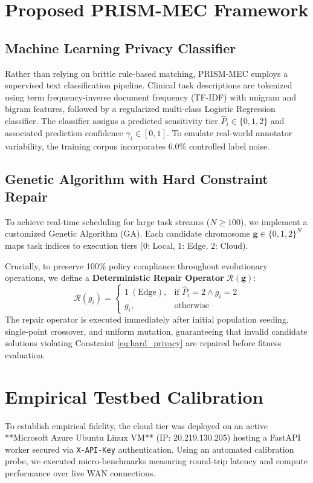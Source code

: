 \documentclass[conference]{IEEEtran}
\begin{document}
\section{Proposed PRISM-MEC Framework}

\subsection{Machine Learning Privacy Classifier}
Rather than relying on brittle rule-based matching, PRISM-MEC employs a supervised text classification pipeline. Clinical task descriptions are tokenized using term frequency-inverse document frequency (TF-IDF) with unigram and bigram features, followed by a regularized multi-class Logistic Regression classifier. The classifier assigns a predicted sensitivity tier $\hat{P}_i \in \{0, 1, 2\}$ and associated prediction confidence $\gamma_i \in [0, 1]$. To emulate real-world annotator variability, the training corpus incorporates 6.0\% controlled label noise.

\subsection{Genetic Algorithm with Hard Constraint Repair}
To achieve real-time scheduling for large task streams ($N \ge 100$), we implement a customized Genetic Algorithm (GA). Each candidate chromosome $\mathbf{g} \in \{0, 1, 2\}^N$ maps task indices to execution tiers ($0$: Local, $1$: Edge, $2$: Cloud).

Crucially, to preserve 100\% policy compliance throughout evolutionary operations, we define a \textbf{Deterministic Repair Operator} $\mathcal{R}(\mathbf{g})$:
\begin{equation}
    \mathcal{R}(g_i) = 
    \begin{cases}
        1 \ (\text{Edge}), & \text{if } \hat{P}_i = 2 \land g_i = 2 \\
        g_i, & \text{otherwise}
    \end{cases}
\end{equation}
The repair operator is executed immediately after initial population seeding, single-point crossover, and uniform mutation, guaranteeing that invalid candidate solutions violating Constraint \eqref{eq:hard_privacy} are repaired before fitness evaluation.

\section{Empirical Testbed Calibration}
To establish empirical fidelity, the cloud tier was deployed on an active **Microsoft Azure Ubuntu Linux VM** (IP: 20.219.130.205) hosting a FastAPI worker secured via \texttt{X-API-Key} authentication. Using an automated calibration probe, we executed micro-benchmarks measuring round-trip latency and compute performance over live WAN connections.
\end{document}
